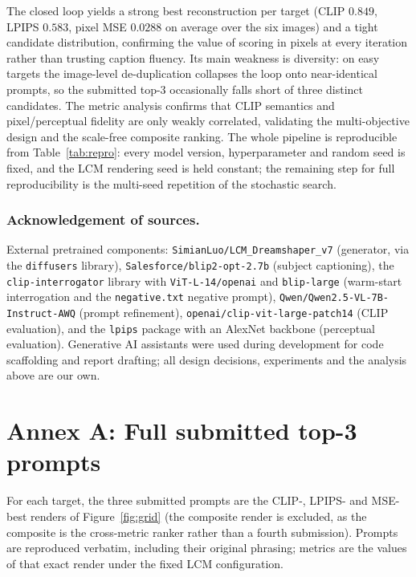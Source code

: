 \documentclass[runningheads]{llncs}
\begin{document}
The closed loop yields a strong best reconstruction per target (CLIP $0.849$, LPIPS $0.583$, pixel MSE $0.0288$ on average over the six images) and a tight candidate distribution, confirming the value of scoring in pixels at every iteration rather than trusting caption fluency. Its main weakness is diversity: on easy targets the image-level de-duplication collapses the loop onto near-identical prompts, so the submitted top-3 occasionally falls short of three distinct candidates. The metric analysis confirms that CLIP semantics and pixel/perceptual fidelity are only weakly correlated, validating the multi-objective design and the scale-free composite ranking. The whole pipeline is reproducible from Table~\ref{tab:repro}: every model version, hyperparameter and random seed is fixed, and the LCM rendering seed is held constant; the remaining step for full reproducibility is the multi-seed repetition of the stochastic search.

\subsubsection*{Acknowledgement of sources.}
External pretrained components: \texttt{SimianLuo/LCM\_Dreamshaper\_v7} (generator, via the \texttt{diffusers} library), \texttt{Salesforce/blip2-opt-2.7b} (subject captioning), the \texttt{clip-interrogator} library with \texttt{ViT-L-14/openai} and \texttt{blip-large} (warm-start interrogation and the \texttt{negative.txt} negative prompt), \texttt{Qwen/\allowbreak Qwen2.5-VL-\allowbreak 7B-Instruct-AWQ} (prompt refinement), \texttt{openai/\allowbreak clip-vit-\allowbreak large-patch14} (CLIP evaluation), and the \texttt{lpips} package with an AlexNet backbone (perceptual evaluation). Generative AI assistants were used during development for code scaffolding and report drafting; all design decisions, experiments and the analysis above are our own.



\clearpage
\section*{Annex A: Full submitted top-3 prompts}
\label{annex:top3}
For each target, the three submitted prompts are the CLIP-, LPIPS- and MSE-best renders of Figure~\ref{fig:grid} (the composite render is excluded, as the composite is the cross-metric ranker rather than a fourth submission). Prompts are reproduced verbatim, including their original phrasing; metrics are the values of that exact render under the fixed LCM configuration.
\end{document}
